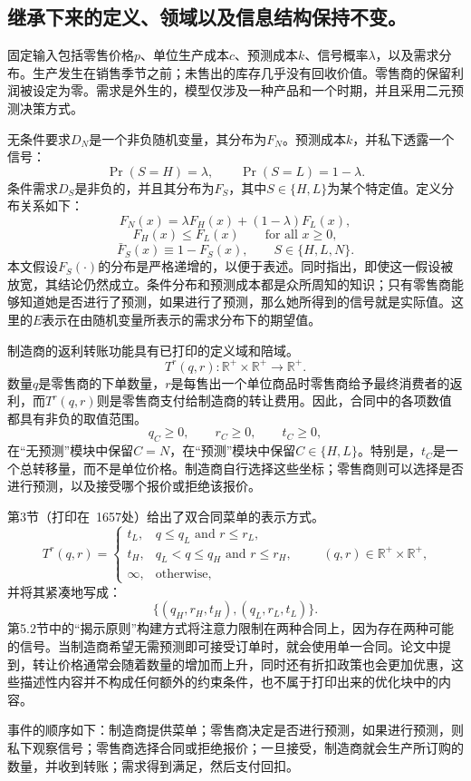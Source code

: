 \documentclass{article}
\begin{document}
\subsection*{继承下来的定义、领域以及信息结构保持不变。}
固定输入包括零售价格$p$、单位生产成本$c$、预测成本$k$、信号概率$\lambda$，以及需求分布。生产发生在销售季节之前；未售出的库存几乎没有回收价值。零售商的保留利润被设定为零。需求是外生的，模型仅涉及一种产品和一个时期，并且采用二元预测决策方式。

无条件要求$D_N$是一个非负随机变量，其分布为$F_N$。预测成本$k$，并私下透露一个信号：
\[
\Pr(S=H)=\lambda,\qquad \Pr(S=L)=1-\lambda.
\]
条件需求$D_S$是非负的，并且其分布为$F_S$，其中$S\in\{H,L\}$为某个特定值。定义分布关系如下：
\[
F_N(x)=\lambda F_H(x)+(1-\lambda)F_L(x),
\]
\[
F_H(x)\leq F_L(x)\qquad\text{for all }x\geq 0,
\]
\[
\bar F_S(x)\equiv 1-F_S(x),\qquad S\in\{H,L,N\}.
\]
本文假设$F_S(\cdot)$的分布是严格递增的，以便于表述。同时指出，即使这一假设被放宽，其结论仍然成立。条件分布和预测成本都是众所周知的知识；只有零售商能够知道她是否进行了预测，如果进行了预测，那么她所得到的信号就是实际值。这里的$E$表示在由随机变量所表示的需求分布下的期望值。

制造商的返利转账功能具有已打印的定义域和陪域。
\[
T^r(q,r):\mathbb R^+\times\mathbb R^+\longrightarrow\mathbb R^+.
\]
数量$q$是零售商的下单数量，$r$是每售出一个单位商品时零售商给予最终消费者的返利，而$T^r(q,r)$则是零售商支付给制造商的转让费用。因此，合同中的各项数值都具有非负的取值范围。
\[
q_C\geq 0,\qquad r_C\geq 0,\qquad t_C\geq 0,
\]
在“无预测”模块中保留$C=N$，在“预测”模块中保留$C\in\{H,L\}$。特别是，$t_C$是一个总转移量，而不是单位价格。制造商自行选择这些坐标；零售商则可以选择是否进行预测，以及接受哪个报价或拒绝该报价。

第3节（打印在~1657处）给出了双合同菜单的表示方式。
\[
T^r(q,r)=
\begin{cases}
t_L,&q\leq q_L\text{ and }r\leq r_L,\\
t_H,&q_L<q\leq q_H\text{ and }r\leq r_H,\\
\infty,&\text{otherwise},
\end{cases}
\qquad (q,r)\in\mathbb R^+\times\mathbb R^+,
\]
并将其紧凑地写成：
\[
\{(q_H,r_H,t_H),(q_L,r_L,t_L)\}.
\]
第5.2节中的“揭示原则”构建方式将注意力限制在两种合同上，因为存在两种可能的信号。当制造商希望无需预测即可接受订单时，就会使用单一合同。论文中提到，转让价格通常会随着数量的增加而上升，同时还有折扣政策也会更加优惠，这些描述性内容并不构成任何额外的约束条件，也不属于打印出来的优化块中的内容。

事件的顺序如下：制造商提供菜单；零售商决定是否进行预测，如果进行预测，则私下观察信号；零售商选择合同或拒绝报价；一旦接受，制造商就会生产所订购的数量，并收到转账；需求得到满足，然后支付回扣。
\end{document}
